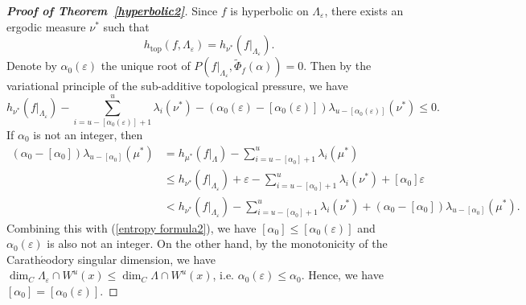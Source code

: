 \documentclass[11pt,a4paper]{amsart}
\theoremstyle{plain}
\theoremstyle{remark}
\begin{document}
\begin{proof}[\textbf{Proof of Theorem~\ref{hyperbolic2}}]
		Since $f$ is hyperbolic on $\Lambda_{\varepsilon}$, there exists an ergodic measure $\nu^{\ast}$ such that $$h_{\text{top}}(f,\Lambda_{\varepsilon})=h_{\nu^{\ast}}(f|_{\Lambda_{\varepsilon}}).$$ Denote by $\alpha_{0}(\varepsilon)$ the unique root of $P(f|_{\Lambda_{\varepsilon}},\tilde{\Phi}_{f}(\alpha))=0$.
		Then by the variational principle of the sub-additive topological pressure, we have
		\begin{equation}\label{entropy formula2}
			h_{\nu^{\ast}}(f|_{\Lambda_{\varepsilon}})-\sum^{u}_{i=u-[\alpha_{0}(\varepsilon)]+1}\lambda_{i}(\nu^{\ast})-(\alpha_{0}(\varepsilon)-[\alpha_{0}(\varepsilon)])\lambda_{u-[\alpha_{0}(\varepsilon)]}(\nu^{\ast})\leq 0.
		\end{equation}
		If $\alpha_{0}$ is not an integer, then
		\begin{align*}
			(\alpha_{0}-[\alpha_{0}])\lambda_{u-[\alpha_{0}]}(\mu^{\ast})&=h_{\mu^{\ast}}(f|_{\Lambda})-\sum^{u}_{i=u-[\alpha_{0}]+1}\lambda_{i}(\mu^{\ast})\\
			&\leq h_{\nu^{\ast}}(f|_{\Lambda_{\varepsilon}})+\varepsilon-\sum^{u}_{i=u-[\alpha_{0}]+1}\lambda_{i}(\nu^{\ast})+[\alpha_{0}]\varepsilon\\
			&< h_{\nu^{\ast}}(f|_{\Lambda_{\varepsilon}})-\sum^{u}_{i=u-[\alpha_{0}]+1}\lambda_{i}(\nu^{\ast})+(\alpha_{0}-[\alpha_{0}])\lambda_{u-[\alpha_{0}]}(\mu^{\ast}).
		\end{align*}
		Combining this with (\ref{entropy formula2}), we have $[\alpha_{0}]\leq [\alpha_{0}(\varepsilon)]$ and $\alpha_{0}(\varepsilon)$ is also not an integer.
		On the other hand, by the monotonicity of the Carath$\acute{\text{e}}$odory singular dimension, we have $\dim_{C}\Lambda_{\varepsilon}\cap W^{u}(x)\leq \dim_{C}\Lambda\cap W^{u}(x)$, i.e. $\alpha_{0}(\varepsilon)\leq \alpha_{0}$. Hence, we have $[\alpha_{0}]=[\alpha_{0}(\varepsilon)]$.
		

\end{proof}
\end{document}
